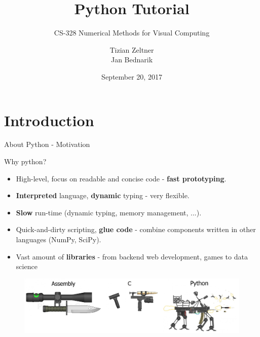 \documentclass[10pt]{beamer}
\title{Python Tutorial}
\subtitle{CS-328 Numerical Methods for Visual Computing}
\date{September 20, 2017}
\author{Tizian Zeltner\\
Jan Bednarik}
\begin{document}
\maketitle


\section{Introduction}

\begin{frame}{About Python - Motivation}

	Why python?
	
	\begin{itemize}
	\item \pause High-level, focus on readable and concise code - \textbf{fast prototyping}.
	\item \pause \textbf{Interpreted} language, \textbf{dynamic} typing - very flexible.
	\item \pause \textbf{Slow} run-time (dynamic typing, memory management, ...).
	\item \pause Quick-and-dirty scripting, \textbf{glue code} - combine components written in other languages (NumPy, SciPy).
	\item \pause Vast amount of \textbf{libraries} - from backend web development, games to data science
	\end{itemize}
	
	\pause
	\begin{figure}[!h]
		\centering
		\includegraphics[width=0.9\linewidth]{img/python_vs_others.png}		
	\end{figure}

\end{frame}

\end{document}
